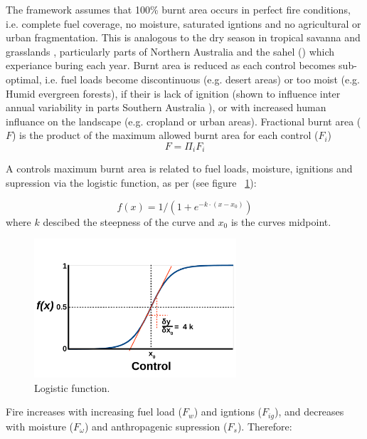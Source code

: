 The framework assumes that 100\% burnt area occurs in perfect fire conditions,  i.e. complete fuel coverage, no moisture, saturated igntions and no agricultural or urban fragmentation. This is analogous to the dry season in tropical savanna and grasslands \citep{kelley2014modelling}, particularly parts of Northern Australia \citep{murphy2013fire} and the sahel () which experiance buring each year.
Burnt area is reduced as each control becomes sub-optimal, i.e.
    fuel loads become discontinuous  (e.g. desert areas)
    or too moist (e.g. Humid evergreen forests),
    if their is lack of ignition (shown to influence inter annual variability in parts Southern Australia \cite{bradstock2010biogeographic}),
    or with increased human influance on the landscape (e.g. cropland or urban areas).
Fractional burnt area ($F$) is the product of the maximum allowed burnt area for each control ($F_i$)
\begin{equation}
    F=\Pi_{i} F_i
    \label{equ:LimFIRE}
\end{equation}

A controls maximum burnt area is related to fuel loads, moisture, ignitions and supression via the logistic function, as per \citet{bistinas2014causal} (see figure ~\ref{fig:Logistic_fun}):

\begin{equation}
    f(x) = 1 / (1 + e^{-k \cdot (x - x_0)})
    \label{equ:fx}
\end{equation}
where $k$ descibed the steepness of the curve and $x_0$ is the curves midpoint.

\begin{figure}[!ht]
  \centering
    \includegraphics[width=0.67\textwidth]{Logistic_fun.pdf}
  \caption{Logistic function.}
  \label{fig:Logistic_fun}
\end{figure}

Fire increases with increasing fuel load ($F_w$) and igntions ($F_{ig}$), and decreases with moisture ($F_{\omega}$) and anthropagenic supression ($F_s$). Therefore:

